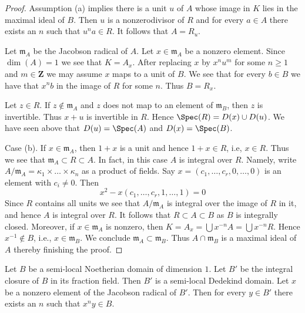 \begin{proof}
Assumption (a) implies there is a unit $u$ of $A$ whose image in $K$ lies in
the maximal ideal of $B$. Then $u$ is a nonzerodivisor of $R$ and for
every $a \in A$ there exists an $n$ such that $u^n a \in R$. It follows
that $A = R_u$.

\medskip\noindent
Let $\mathfrak m_A$ be the Jacobson radical of $A$. Let $x \in \mathfrak m_A$
be a nonzero element. Since $\dim(A) = 1$ we see that $K = A_x$.
After replacing $x$ by $x^n u^m$ for some $n \geq 1$ and
$m \in \mathbf{Z}$ we may assume $x$ maps to a unit of $B$.
We see that for every $b \in B$ we have that $x^nb$
in the image of $R$ for some $n$. Thus $B = R_x$.

\medskip\noindent
Let $z \in R$. If $z \not \in \mathfrak m_A$ and $z$ does not map to
an element of $\mathfrak m_B$, then $z$ is invertible.
Thus $x + u$ is invertible in $R$. Hence $\Spec(R) = D(x) \cup D(u)$.
We have seen above that $D(u) = \Spec(A)$ and $D(x) = \Spec(B)$.

\medskip\noindent
Case (b). If $x \in \mathfrak m_A$, then $1 + x$ is a unit and
hence $1 + x \in R$, i.e, $x \in R$. Thus we see that
$\mathfrak m_A \subset R \subset A$. In fact, in this case
$A$ is integral over $R$. Namely, write
$A/\mathfrak m_A = \kappa_1 \times \ldots \times \kappa_n$
as a product of fields. Say $x = (c_1, \ldots, c_r, 0, \ldots, 0)$
is an element with $c_i \not = 0$. Then
$$
x^2 - x(c_1, \ldots, c_r, 1, \ldots, 1)  = 0
$$
Since $R$ contains all units we see that $A/\mathfrak m_A$ is
integral over the image of $R$ in it, and hence $A$ is integral over $R$.
It follows that $R \subset A \subset B$ as $B$ is integrally closed.
Moreover, if $x \in \mathfrak m_A$ is nonzero, then
$K = A_x = \bigcup x^{-n}A = \bigcup x^{-n}R$.
Hence $x^{-1} \not \in B$, i.e., $x \in \mathfrak m_B$.
We conclude $\mathfrak m_A \subset \mathfrak m_B$.
Thus $A \cap \mathfrak m_B$ is a maximal ideal of $A$ thereby
finishing the proof.
\end{proof}

\begin{lemma}
\label{lemma-semi-local-dimension-one-conductor}
Let $B$ be a semi-local Noetherian domain of dimension $1$.
Let $B'$ be the integral closure of $B$ in its fraction field.
Then $B'$ is a semi-local Dedekind domain.
Let $x$ be a nonzero element of the Jacobson radical of $B'$.
Then for every $y \in B'$ there exists an $n$ such that
$x^n y \in B$.
\end{lemma}

